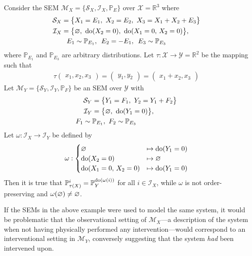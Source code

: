 \begin{example}\label{example:wrong1}
Consider the SEM $\mathcal{M}_X=\{\mathcal{S}_X , \mathcal{I}_X, \mathbb{P}_E\}$ over $\mathcal{X}=\mathbb{R}^3$ where
%
\begin{align*}
\mathcal{S}_X = \big\{ & X_1 = E_1,\ X_2 = E_2,\ X_3 = X_1 + X_2 + E_3 \big\} \\
%
\mathcal{I}_X = \big\{ & \nulli,\ \doop(X_2=0),\ \doop(X_1=0,\, X_2=0)\big\}, \\
%
E_1 & \sim \mathbb{P}_{E_1},\ \,  E_2 = - E_1, \  \, E_3 \sim \mathbb{P}_{E_3}
\end{align*}
%
where $\mathbb{P}_{E_1}$ and $\mathbb{P}_{E_3}$ are arbitrary distributions.
Let ${\tau:\mathcal{X}\to\mathcal{Y}=\mathbb{R}^2}$ be the mapping such that
\begin{align*}
\tau\begin{pmatrix} x_1, x_2, x_3 \end{pmatrix}
= \begin{pmatrix} y_1, y_2\end{pmatrix}
= \begin{pmatrix} x_1 + x_2, x_3\end{pmatrix}
\end{align*}
%
Let $\mathcal{M}_Y =\{\mathcal{S}_Y , \mathcal{I}_Y, \mathbb{P}_F\}$ be an SEM over $\mathcal{Y}$ with
%
\begin{align*}
\mathcal{S}_Y = \big\{ & Y_1 = F_1,\ Y_2 = Y_1 + F_2 \big\} \\
%
\mathcal{I}_Y = \big\{ & \nulli,\ \doop(Y_1=0) \big\}, \\
%
F_1 \sim \mathbb{P}_{E_1},&  \  \, F_2 \sim \mathbb{P}_{E_3}
\end{align*}
%
Let ${\omega:\mathcal{I}_X \to \mathcal{I}_Y}$ be defined by
%
\begin{align*}
\omega: \begin{cases}
\varnothing &\mapsto \operatorname{do}(Y_1=0) \\
\operatorname{do}(X_2=0) &\mapsto \varnothing \\
\operatorname{do}(X_1=0,\, X_2=0) &\mapsto \operatorname{do}(Y_1=0) \\
\end{cases}
\end{align*}
%
Then it is true that ${\mathbb{P}_{\tau(X)}^{i} = \mathbb{P}_Y^{\operatorname{do}(\omega(i))}}$ for all  ${i \in \mathcal{I}_X }$, while $\omega$ is not order-preserving and $\omega(\varnothing)\not = \varnothing$.
\end{example}

If the SEMs in the above example were used to model the same system, it would be problematic that the observational setting of $\mathcal{M}_X$---a description of the system when not having physically performed any intervention---would correspond to an interventional setting in $\mathcal{M}_Y$, conversely suggesting that the system \emph{had} been intervened upon.

